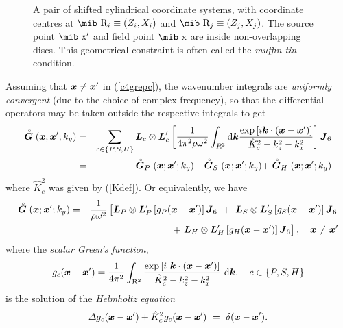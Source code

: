 \begin{figure}
\HideDisplacementBoxes
\centerline{}
\caption{A pair of shifted cylindrical coordinate systems, with 
coordinate centres at $\mbox{\mib R}{}_{i}\equiv(Z_i,X_i)$
and $\mbox{\mib R}{}_{j}\equiv(Z_j,X_j)$. The source point
$\mbox{\mib x}{}^{\prime}$
and field 
point $\mbox{\mib x}$ are inside non-overlapping discs. This geometrical 
constraint is often called the {\em muffin tin\/} condition. }
\protect\label{coords}
\end{figure}







Assuming that ${\bmi  x}\not={{\bmi  x}}^{\prime}$ in (\ref{c4grepc}), the 
wavenumber integrals are {\em uniformly convergent\/} (due to the choice of complex 
frequency), so that the differential operators may be taken outside the 
respective integrals to get
\begin{eqnarray} \label{grep3}
\rf{\bmi  G}({\bmi  x};{{\bmi  x}}^{\prime};k_y)&=&\sum\limits_{c\in \{P,S,H\}}
 {\bmi L}_{c } \otimes {\bmi  L}_{c}^{\prime}
\left[ \frac{1}{4{ \pi }^{2}\rho \omega^2}
\int_{{R}^{2}} {\rm d}{\bmi k} 
\frac{
\exp \left[{i {\bmi k}  \cdot  ({\bmi x}-{\bmi x}^{\prime})}\right]  
}{ \hat{K}^{2}_{ c } - {k}^{2}_{z} - {k}^{2}_{x}}
\right] {\bmi J}_{6}\nonumber\\
&=&
\rf{\bmi  G}_{P}({\bmi  x};{{\bmi  x}}^{\prime};k_y)+
\rf{\bmi  G}_{S}({\bmi  x};{{\bmi  x}}^{\prime};k_y)+
\rf{\bmi  G}_{H}({\bmi  x};{{\bmi  x}}^{\prime};k_y)
\end{eqnarray}
where $\hat{K}_{c}^2$ was given by (\ref{Kdef}).
Or equivalently, we have
\begin{eqnarray}	\label{Gdef1}
\rf{\bmi  G}({\bmi  x};{{\bmi  x}}^{\prime};k_y)&=& {\frac{1}{\rho 
\omega^2}}\left[{\bmi 
L}_{P} \otimes {\bmi  L}_{P}^{\prime}\left[{ g}_{P } ({\bmi  x}-{{\bmi 
	x}}^{\prime})\right] {\bmi  J}_6 \  
	+\  {\bmi  L}_{S}
	\otimes {\bmi  L}_{S}^{\prime}\left[{ g}_{S } ({\bmi  x}-{{\bmi 
	x}}^{\prime})\right] {\bmi  J}_6\right.\nonumber\\
	&&\left. +\  {\bmi  L}_{H}
	\otimes {\bmi  L}_{H}^{\prime}\left[{ g}_{H } ({\bmi  x}-{{\bmi 
	x}}^{\prime})\right] {\bmi  J}_6 \right], \quad {\bmi  x}\not={{\bmi  x}}^{\prime}
\end{eqnarray}
where the {\em scalar Green's function\/},
\begin{equation} \label{Ig}
{g}_{c }({\bmi  x} -{\bmi  x}^{\prime} ) =  \frac{1}{4{ \pi }^{2}}
\int_{{\Bbb R}^2} \frac{\exp \left[i\ {\bmi  k}
\cdot ({\bmi  x} -{\bmi  x}^{\prime} )\right]}{\hat{K}^{2}_{ c } - {k}^{2}_{z} - {k}^{2}_{x}}\
{ {\rm d}}{\bmi  k},\quad  c\in\{P,S,H\}
\end{equation} 
is the solution of the {\em Helmholtz equation\/}
\begin{equation} \label{HelmhotzEqn}
 {\mit \Delta} {  g}_{c }  ({\bmi  x}-{{\bmi  x}}^{ \prime})+\hat{K}_{ c }^{2}{g}_{ c
}({\bmi  x}-{{\bmi  x}}^{ \prime})\ =\  \delta   ({\bmi  x}-{{\bmi  x}}^{ 
\prime}).
\end{equation}

